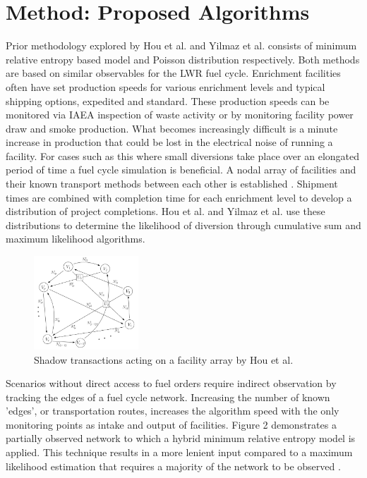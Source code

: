 \documentclass{anstrans}
\begin{document}
\section{Method: Proposed Algorithms}
Prior methodology explored by Hou et al. and Yilmaz et al. \cite{Hou_2016,Yilmaz_2016} consists of minimum relative 
entropy based model and Poisson distribution respectively. Both methods are based on similar observables for the LWR 
fuel cycle. Enrichment facilities often have set production speeds for various enrichment levels and typical shipping 
options, expedited and standard. These production speeds can be monitored via IAEA inspection of waste activity or by 
monitoring facility power draw and smoke production. What becomes increasingly difficult is a minute increase in 
production that could be lost in the electrical noise of running a facility. For cases such as this where small 
diversions take place over an elongated period of time a fuel cycle simulation is beneficial. A nodal array of 
facilities and their known transport methods between each other is established \cite{Hou_2016}. Shipment times are 
combined with completion time for each enrichment level to develop a distribution of project completions. Hou et al. 
and Yilmaz et al. use these distributions to determine the likelihood of diversion through cumulative sum and maximum 
likelihood algorithms.

\begin{figure}[ht] %
	\centering
	\includegraphics[width=0.35\textwidth]{Hou_Network}
	\caption{Shadow transactions acting on a facility array by Hou et al\cite{Hou_2016}.}
	\label{fig:maximumlikelihood}
\end{figure}

 Scenarios without direct access to fuel orders require indirect observation by tracking the edges of a fuel cycle 
 network. Increasing the number of known 'edges', or transportation routes, increases the algorithm speed with the 
 only monitoring points as intake and output of facilities. Figure 2 demonstrates a partially observed network to 
 which a hybrid minimum relative entropy model is applied. This technique results in a more lenient input compared 
 to a maximum likelihood estimation that requires a majority of the network to be observed \cite{Hou_2016}.
\end{document}
